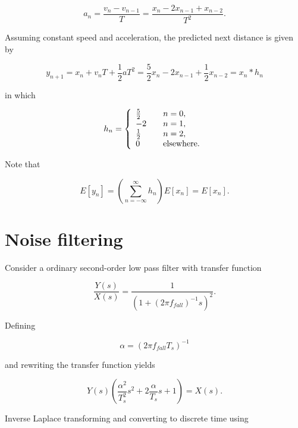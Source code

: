 \documentclass[11pt,titlepage]{report}
\begin{document}
\begin{appendices}
\begin{equation}
	a_n = \frac{v_n - v_{n-1}}{T} = \frac{x_{n} - 2 x_{n-1} + x_{n-2}}{T^2}.
\end{equation}

Assuming constant speed and acceleration, the predicted next distance is given by

\begin{equation}
	y_{n+1} = x_{n} + v_n T + \frac{1}{2} a T^2 = \frac{5}{2} x_n - 2 x_{n-1} + \frac{1}{2} x_{n-2}= x_n \ast h_n
\end{equation}

in which

\begin{equation}
	h_n = \left\{
	\begin{array}{l l}
		\frac{5}{2} & \quad n = 0, \\
		-2 & \quad n = 1, \\
		\frac{1}{2} & \quad n = 2, \\
		0 & \quad \text{elsewhere}.
	\end{array}
	\right.
\end{equation}

Note that

\begin{equation}
	E[y_n] = \left( \sum_{n=-\infty}^{\infty} h_n \right) E[x_n] = E[x_n].
\end{equation}

\section{Noise filtering}

Consider a ordinary second-order low pass filter with transfer function

\begin{equation}
	\frac{Y(s)}{X(s)}=\frac{1}{(1+(2 \pi f_{fall})^{-1} s)^2}.
\end{equation}

Defining

\begin{equation}
	\alpha = (2 \pi f_{fall} T_s)^{-1}
\end{equation}

and rewriting the transfer function yields

\begin{equation}
	Y(s) \left(\frac{\alpha^2}{T_s^2} s^2 + 2 \frac{\alpha}{T_s} s + 1 \right) = X(s).
\end{equation}

Inverse Laplace transforming and converting to discrete time using


\end{appendices}
\end{document}
